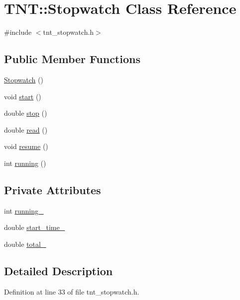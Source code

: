 \hypertarget{classTNT_1_1Stopwatch}{}\section{T\+NT\+:\+:Stopwatch Class Reference}
\label{classTNT_1_1Stopwatch}


{\ttfamily \#include $<$tnt\+\_\+stopwatch.\+h$>$}

\subsection*{Public Member Functions}
\begin{DoxyCompactItemize}
\item 
\hyperlink{classTNT_1_1Stopwatch_a976a48f6c1cc30db1c1873fe1befd043}{Stopwatch} ()
\item 
void \hyperlink{classTNT_1_1Stopwatch_acffbfa774f877e9cc5c0ed9f76fcf97d}{start} ()
\item 
double \hyperlink{classTNT_1_1Stopwatch_a9212d1af18b726c3869fd3f720e75ea8}{stop} ()
\item 
double \hyperlink{classTNT_1_1Stopwatch_ad4d107c357a747472cf6c2a5065c984e}{read} ()
\item 
void \hyperlink{classTNT_1_1Stopwatch_a2eaa2b36d880c4ef6c6f7c57a11bea59}{resume} ()
\item 
int \hyperlink{classTNT_1_1Stopwatch_a4d508deee9b0ad0971f09dff0da98d51}{running} ()
\end{DoxyCompactItemize}
\subsection*{Private Attributes}
\begin{DoxyCompactItemize}
\item 
int \hyperlink{classTNT_1_1Stopwatch_a892b25c730a3f494a88a0456ee7a426a}{running\+\_\+}
\item 
double \hyperlink{classTNT_1_1Stopwatch_a354390f67fbc2ecc42cf37809cf681d4}{start\+\_\+time\+\_\+}
\item 
double \hyperlink{classTNT_1_1Stopwatch_a3578a5367bc8069513a091dde3b81988}{total\+\_\+}
\end{DoxyCompactItemize}


\subsection{Detailed Description}


Definition at line 33 of file tnt\+\_\+stopwatch.\+h.



